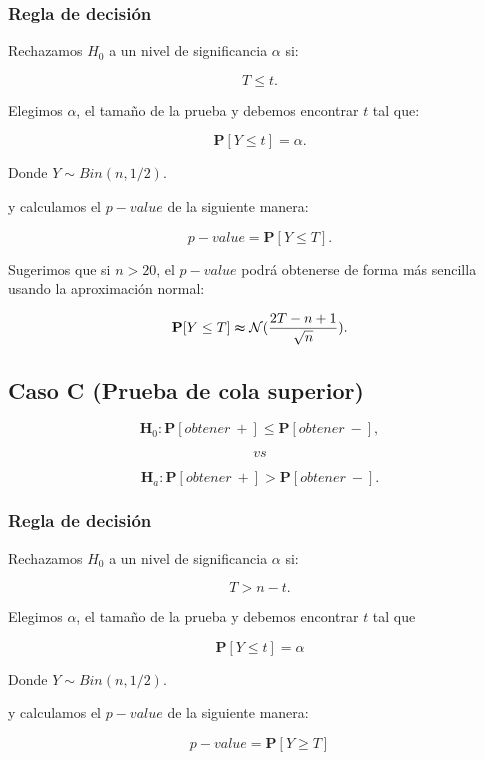 \documentclass[
  a4paper,
  oneside,
  openany]{book}
\begin{document}
\hypertarget{regla-de-decisiuxf3n-11}{%
\subsubsection*{Regla de decisión}\label{regla-de-decisiuxf3n-11}}


Rechazamos \(H_0\) a un nivel de significancia \(\alpha\) si:

\[T \leq t.\]

Elegimos \(\alpha\), el tamaño de la prueba y debemos encontrar \(t\) tal que:

\[\mathbf{P}[Y \leq t]=\alpha.\]

Donde \(Y \sim Bin (n,1/2)\).

y calculamos el \(p-value\) de la siguiente manera:

\[p-value=\mathbf{P}[Y\leq T].\]

Sugerimos que si \(n>20\), el \(p-value\) podrá obtenerse de forma más sencilla usando la aproximación normal:

\[\mathbf{P}[Y\leq T] \thickapprox  \mathcal{N} (\frac{2T-n+1}{\sqrt{n}}).\]

\hypertarget{caso-c-prueba-de-cola-superior-3}{%
\subsection*{Caso C (Prueba de cola superior)}\label{caso-c-prueba-de-cola-superior-3}}


\[\textbf{H}_0: \mathbf{P}[obtener\ +] \leq \mathbf{P}[obtener\ -],\]

\[vs\]

\[\textbf{H}_a: \mathbf{P}[obtener\ +] > \mathbf{P}[obtener\ -].\]

\hypertarget{regla-de-decisiuxf3n-12}{%
\subsubsection*{Regla de decisión}\label{regla-de-decisiuxf3n-12}}


Rechazamos \(H_0\) a un nivel de significancia \(\alpha\) si:

\[T > n-t.\]

Elegimos \(\alpha\), el tamaño de la prueba y debemos encontrar \(t\) tal que

\[\mathbf{P}[Y \leq t]=\alpha\]

Donde \(Y \sim Bin (n,1/2)\).

y calculamos el \(p-value\) de la siguiente manera:

\[p-value=\mathbf{P}[Y\geq T]\]
\end{document}
